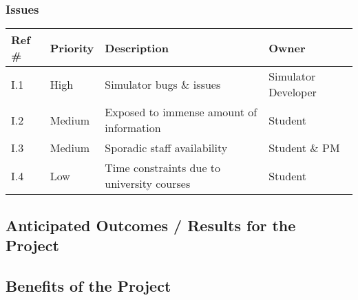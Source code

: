 \subsubsection{Issues}

\begin{tabular}{|l|l|l|l|}
\hline
{\bf Ref \#} & {\bf Priority} & {\bf Description} & {\bf Owner} \\
\hline
I.1 & High & Simulator bugs \& issues & Simulator Developer \\
\hline
I.2 & Medium & Exposed to immense amount of information & Student \\
\hline
I.3 & Medium & Sporadic staff availability  & Student \& PM \\
\hline
I.4 & Low & Time constraints due to university courses & Student \\
\hline
\end{tabular}


\newpage
\subsection{Anticipated Outcomes / Results for the Project}


\subsection{Benefits of the Project}
